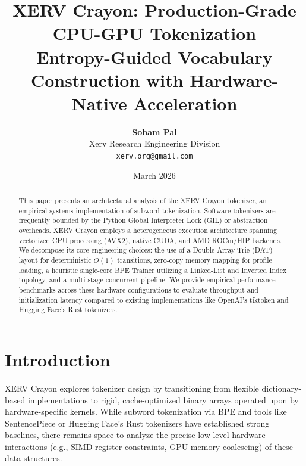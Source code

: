 \documentclass[11pt,a4paper,twocolumn]{article}
\title{\textbf{XERV Crayon: Production-Grade CPU-GPU Tokenization}\\[0.5em]
\large Entropy-Guided Vocabulary Construction with Hardware-Native Acceleration}
\author{
\textbf{Soham Pal}\\
Xerv Research Engineering Division\\
\texttt{xerv.org@gmail.com}
}
\date{March 2026}
\begin{document}
\maketitle

\begin{abstract}
This paper presents an architectural analysis of the XERV Crayon tokenizer, an empirical systems implementation of subword tokenization. Software tokenizers are frequently bounded by the Python Global Interpreter Lock (GIL) or abstraction overheads. XERV Crayon employs a heterogeneous execution architecture spanning vectorized CPU processing (AVX2), native CUDA, and AMD ROCm/HIP backends. We decompose its core engineering choices: the use of a Double-Array Trie (DAT) layout for deterministic $O(1)$ transitions, zero-copy memory mapping for profile loading, a heuristic single-core BPE Trainer utilizing a Linked-List and Inverted Index topology, and a multi-stage concurrent pipeline. We provide empirical performance benchmarks across these hardware configurations to evaluate throughput and initialization latency compared to existing implementations like OpenAI's tiktoken and Hugging Face's Rust tokenizers.
\end{abstract}

{\small\tableofcontents}
\vspace{0.5em}

\section{Introduction}
\label{sec:introduction}

XERV Crayon explores tokenizer design by transitioning from flexible dictionary-based implementations to rigid, cache-optimized binary arrays operated upon by hardware-specific kernels. While subword tokenization via BPE \cite{sennrich2016} and tools like SentencePiece \cite{kudo2018} or Hugging Face's Rust tokenizers have established strong baselines, there remains space to analyze the precise low-level hardware interactions (e.g., SIMD register constraints, GPU memory coalescing) of these data structures.
\end{document}

